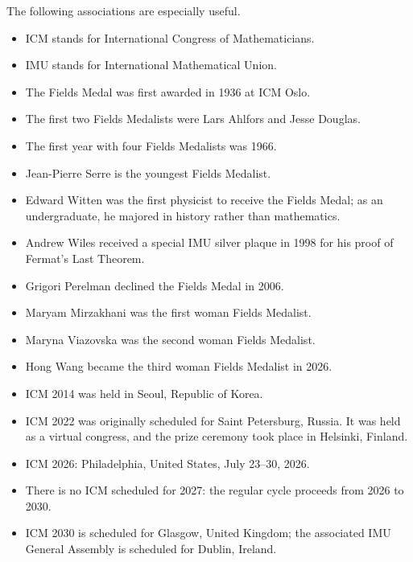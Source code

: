     \begin{fact}
        The following associations are especially useful.
        \begin{itemize}
            \item ICM stands for International Congress of Mathematicians.
            \item IMU stands for International Mathematical Union.
            \item The Fields Medal was first awarded in 1936 at ICM Oslo.
            \item The first two Fields Medalists were Lars Ahlfors and Jesse Douglas.
            \item The first year with four Fields Medalists was 1966.
            \item Jean-Pierre Serre is the youngest Fields Medalist.
            \item Edward Witten was the first physicist to receive the Fields Medal; as an
            undergraduate, he majored in history rather than mathematics.
            \item Andrew Wiles received a special IMU silver plaque in 1998 for
                  his proof of Fermat's Last Theorem.
            \item Grigori Perelman declined the Fields Medal in 2006.
            \item Maryam Mirzakhani was the first woman Fields Medalist.
            \item Maryna Viazovska was the second woman Fields Medalist.
            \item Hong Wang became the third woman Fields Medalist in 2026.
            \item ICM 2014 was held in Seoul, Republic of Korea.
            \item ICM 2022 was originally scheduled for Saint Petersburg,
                  Russia. It was held as a virtual congress, and the prize
                  ceremony took place in Helsinki, Finland.
            \item ICM 2026: Philadelphia, United States, July 23--30, 2026.
            \item There is no ICM scheduled for 2027: the regular cycle proceeds
                  from 2026 to 2030.
            \item ICM 2030 is scheduled for Glasgow, United Kingdom; the associated IMU
                  General Assembly is scheduled for Dublin, Ireland.
        \end{itemize}
    \end{fact}

